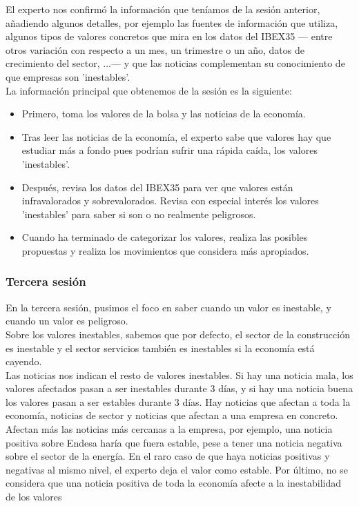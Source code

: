 El experto nos confirmó la información que teníamos de la sesión anterior, añadiendo algunos detalles, por ejemplo las fuentes de información que utiliza, algunos tipos de valores concretos que mira en los datos del IBEX35 --- entre otros variación con respecto a un mes, un trimestre o un año, datos de crecimiento del sector, ...--- y que las noticias complementan su conocimiento de que empresas son 'inestables'.\\

La información principal que obtenemos de la sesión es la siguiente:
\begin{itemize}
\item Primero, toma los valores de la bolsa y las noticias de la economía.
\item Tras leer las noticias de la economía, el experto sabe que valores hay que estudiar más a fondo pues podrían sufrir una rápida caída, los valores 'inestables'.
\item Después, revisa los datos del IBEX35 para ver que valores están infravalorados y sobrevalorados. Revisa con especial interés los valores 'inestables' para saber si son o no realmente peligrosos.
\item Cuando ha terminado de categorizar los valores, realiza las posibles propuestas y realiza los movimientos que considera más apropiados.
\end{itemize}

\subsubsection{Tercera sesión}

En la tercera sesión, pusimos el foco en saber cuando un valor es inestable, y cuando un valor es peligroso.\\

Sobre los valores inestables, sabemos que por defecto, el sector de la construcción es inestable y el sector servicios también es inestables si la economía está cayendo.\\

Las noticias nos indican el resto de valores inestables. Si hay una noticia mala, los valores afectados pasan a ser inestables durante 3 días, y si hay una noticia buena los valores pasan a ser estables durante 3 días. Hay noticias que afectan a toda la economía, noticias de sector y noticias que afectan a una empresa en concreto. Afectan más las noticias más cercanas a la empresa, por ejemplo, una noticia positiva sobre Endesa haría que fuera estable, pese a tener una noticia negativa sobre el sector de la energía. En el raro caso de que haya noticias positivas y negativas al mismo nivel, el experto deja el valor como estable. Por último, no se considera que una noticia positiva de toda la economía afecte a la inestabilidad de los valores\\

